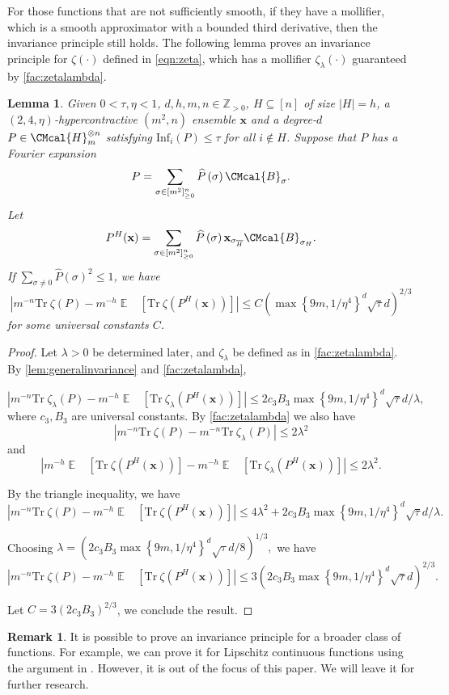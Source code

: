 \documentclass[10pt,a4paper]{article}
\def\B{\CMcal{B}}
\def\H{\CMcal{H}}
\theoremstyle{plain}
\newtheorem{lemma}[theorem]{Lemma}
\theoremstyle{definition}
\newtheorem{remark}[theorem]{Remark}
\newcommand {\minusspace} {\: \! \!}
\newcommand {\Fn} [2] {\ensuremath{ #1 \minusspace \Br{ #2 } }}
\newcommand {\set} [1] {\ensuremath{ \left\lbrace #1 \right\rbrace }}
\newcommand {\br} [1] {\ensuremath{ \left( #1 \right) }}
\newcommand {\Br} [1] {\ensuremath{ \left[ #1 \right] }}
\newcommand {\ab} [1] {\ensuremath{ \left| #1 \right| }}
\DeclareMathOperator*{\bigE}{\mathbb{E}}
\newcommand {\expec} [2] {\Fn{\bigE_{\substack{#1}}}{#2}}
\newcommand {\Tr} {\ensuremath{ \mathrm{Tr} }}
\newcommand{\posint}{{\mathbb Z}_{>0}}
\newcommand{\randx}{\ensuremath{\mathbf{x}}}
\newcommand{\infi}[1]{\ensuremath{\mathrm{Inf}_i}\br{#1}}
\newcommand{\sigmarange}[1]{\ensuremath{\sigma\in[m^2]_{\geq0}^{#1}}}
\newcommand{\1}{\mathbb{1}} %
\begin{document}
For those functions that are not sufficiently smooth, if they have a mollifier, which is a smooth approximator with a bounded third derivative, then the invariance principle still holds. The following lemma proves an invariance principle for $\zeta\br{\cdot}$ defined in \cref{eqn:zeta}, which has a mollifier $\zeta_{\lambda}\br{\cdot}$ guaranteed by \cref{fac:zetalambda}.

\begin{lemma}\label{lem:zetainvariance}
	Given $0<\tau,\eta<1$, $d,h,m,n\in\posint$, $H\subseteq[n]$ of size $\ab{H}=h$, a $(2,4,\eta)$-hypercontractive  $(m^2,n)$ ensemble $\randx$ and a degree-$d$ $P\in\H_m^{\otimes n}$ satisfying $\infi{P}\leq\tau$ for all $i\notin H$. Suppose that $P$ has a Fourier expansion
	\[P=\sum_{\sigmarange{n}}\widehat{P}\br{\sigma}\B_\sigma.\]
	Let
	\[P^H(\randx)=\sum_{\sigmarange{n}}\widehat{P}\br{\sigma}\randx_{\sigma_{\overline{H}}}\B_{\sigma_H}.\]
	If $\sum_{\sigma\ne0}\widehat{P}\br{\sigma}^2\leq1$, we have
	\[\ab{m^{-n}\Tr~\zeta\br{P}-m^{-h}\expec{}{\Tr~\zeta\br{P^H(\randx)}}}\leq C\br{\max\set{9m,1/\eta^4}^d\sqrt{\tau}d}^{2/3}\]
	for some universal constants $C$.
\end{lemma}

\begin{proof}
Let $\lambda>0$ be determined later, and $\zeta_\lambda$ be defined as in \cref{fac:zetalambda}. By \cref{lem:generalinvariance} and \cref{fac:zetalambda},

\[\ab{m^{-n}\Tr~\zeta_\lambda\br{P}-m^{-h}\expec{}{\Tr~\zeta_\lambda\br{P^H(\randx)}}}\leq 2c_3 B_3 \max\set{9m,1/\eta^4}^d\sqrt{\tau}d/\lambda,\]
where $c_3,B_3$ are universal constants. By \cref{fac:zetalambda} we also have
\[\ab{m^{-n}\Tr~\zeta\br{P}-m^{-n}\Tr~\zeta_\lambda\br{P}}\leq 2\lambda^2\]
and
\[\ab{m^{-h}\expec{}{\Tr~\zeta\br{P^H(\randx)}}-m^{-h}\expec{}{\Tr~\zeta_\lambda\br{P^H(\randx)}}}\leq 2\lambda^2.\]

By the triangle inequality, we have
\[\ab{m^{-n}\Tr~\zeta\br{P}-m^{-h}\expec{}{\Tr~\zeta\br{P^H(\randx)}}}\leq4\lambda^2+2c_3 B_3 \max\set{9m,1/\eta^4}^d\sqrt{\tau}d/\lambda.\]

Choosing $\lambda=\br{2c_3 B_3 \max\set{9m,1/\eta^4}^d\sqrt{\tau}d/8}^{1/3},$ we have
\[\ab{m^{-n}\Tr~\zeta\br{P}-m^{-h}\expec{}{\Tr~\zeta\br{P^H(\randx)}}}\leq3\br{2c_3 B_3 \max\set{9m,1/\eta^4}^d\sqrt{\tau}d}^{2/3}.\]

Let $C=3\br{2c_3B_3}^{2/3}$, we conclude the result.
\end{proof}

\begin{remark}
It is possible to prove an invariance principle for a broader class of functions. For example, we can prove it for Lipschitz continuous functions using the argument in \cite[Lemma 3.5]{isaksson2012maximally}. However, it is out of the focus of this paper. We will leave it for further research.
\end{remark}
\end{document}
